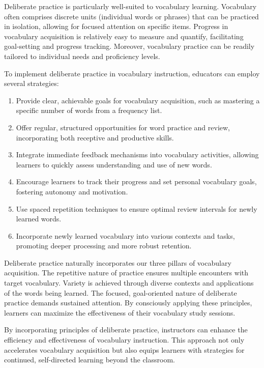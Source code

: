 Deliberate practice is particularly well-suited to vocabulary learning. Vocabulary often comprises discrete units (individual words or phrases) that can be practiced in isolation, allowing for focused attention on specific items. Progress in vocabulary acquisition is relatively easy to measure and quantify, facilitating goal-setting and progress tracking. Moreover, vocabulary practice can be readily tailored to individual needs and proficiency levels.

To implement deliberate practice in vocabulary instruction, educators can employ several strategies:

\begin{enumerate}
    \item Provide clear, achievable goals for vocabulary acquisition, such as mastering a specific number of words from a frequency list.
    
    \item Offer regular, structured opportunities for word practice and review, incorporating both receptive and productive skills.
    
    \item Integrate immediate feedback mechanisms into vocabulary activities, allowing learners to quickly assess understanding and use of new words.
    
    \item Encourage learners to track their progress and set personal vocabulary goals, fostering autonomy and motivation.
    
    \item Use spaced repetition techniques to ensure optimal review intervals for newly learned words.
    
    \item Incorporate newly learned vocabulary into various contexts and tasks, promoting deeper processing and more robust retention.
\end{enumerate}

Deliberate practice naturally incorporates our three pillars of vocabulary acquisition. The repetitive nature of practice ensures multiple encounters with target vocabulary. Variety is achieved through diverse contexts and applications of the words being learned. The focused, goal-oriented nature of deliberate practice demands sustained attention. By consciously applying these principles, learners can maximize the effectiveness of their vocabulary study sessions.

By incorporating principles of deliberate practice, instructors can enhance the efficiency and effectiveness of vocabulary instruction. This approach not only accelerates vocabulary acquisition but also equips learners with strategies for continued, self-directed learning beyond the classroom.

